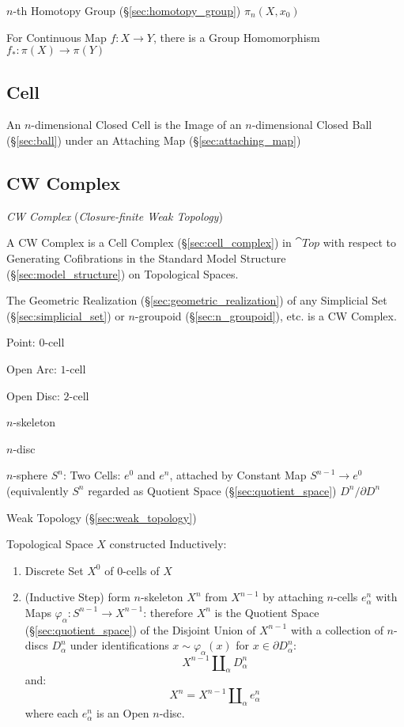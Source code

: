 $n$-th Homotopy Group (\S\ref{sec:homotopy_group}) $\pi_n(X,x_0)$

For Continuous Map $f : X \rightarrow Y$, there is a Group
Homomorphism $f_* : \pi (X) \rightarrow \pi (Y)$



\subsection{Cell}\label{sec:topology_cell}

An $n$-dimensional Closed Cell is the Image of an $n$-dimensional
Closed Ball (\S\ref{sec:ball}) under an Attaching Map
(\S\ref{sec:attaching_map})



\subsection{CW Complex}\label{sec:cw_complex}

\emph{CW Complex} (\emph{Closure-finite Weak Topology})

A CW Complex is a Cell Complex (\S\ref{sec:cell_complex}) in
$\cat{Top}$ with respect to Generating Cofibrations in the Standard
Model Structure (\S\ref{sec:model_structure}) on Topological Spaces.

The Geometric Realization (\S\ref{sec:geometric_realization}) of any
Simplicial Set (\S\ref{sec:simplicial_set}) or $n$-groupoid
(\S\ref{sec:n_groupoid}), etc. is a CW Complex.

Point: $0$-cell

Open Arc: $1$-cell

Open Disc: $2$-cell

$n$-skeleton

$n$-disc

$n$-sphere $S^n$: Two Cells: $e^0$ and $e^n$, attached by Constant Map
$S^{n-1} \rightarrow e^0$ (equivalently $S^n$ regarded as Quotient
Space (\S\ref{sec:quotient_space}) $D^n/ \partial D^n$

Weak Topology (\S\ref{sec:weak_topology})

Topological Space $X$ constructed Inductively: \cite{hatcher02}
\begin{enumerate}
  \item Discrete Set $X^0$ of $0$-cells of $X$
  \item (Inductive Step) form $n$-skeleton $X^n$ from $X^{n-1}$ by
    attaching $n$-cells $e^n_\alpha$ with Maps $\varphi_\alpha :
    S^{n-1} \rightarrow X^{n-1}$: therefore $X^n$ is the Quotient
    Space (\S\ref{sec:quotient_space}) of the Disjoint Union of
    $X^{n-1}$ with a collection of $n$-discs $D^n_\alpha$ under
    identifications $x \sim \varphi_\alpha(x)$ for $x \in \partial
    D^n_\alpha$:
    \[
      X^{n-1}\amalg_\alpha D^n_\alpha
    \]
    and:
    \[
      X^n = X^{n-1}\amalg_\alpha e^n_\alpha
    \]
    where each $e^n_\alpha$ is an Open $n$-disc.
\end{enumerate}

